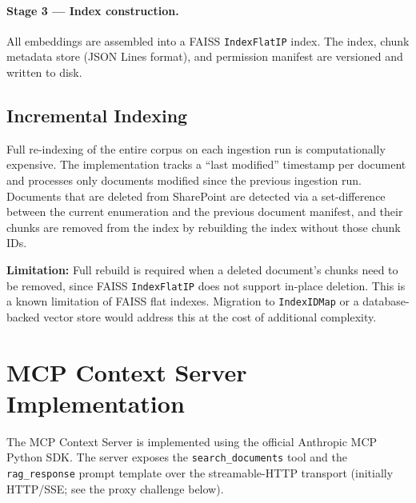 \paragraph{Stage 3 --- Index construction.} All embeddings are assembled into a FAISS \texttt{IndexFlatIP} index. The index, chunk metadata store (JSON Lines format), and permission manifest are versioned and written to disk.

\subsection{Incremental Indexing}

Full re-indexing of the entire corpus on each ingestion run is computationally expensive. The implementation tracks a ``last modified'' timestamp per document and processes only documents modified since the previous ingestion run. Documents that are deleted from SharePoint are detected via a set-difference between the current enumeration and the previous document manifest, and their chunks are removed from the index by rebuilding the index without those chunk IDs.

\textbf{Limitation:} Full rebuild is required when a deleted document's chunks need to be removed, since FAISS \texttt{IndexFlatIP} does not support in-place deletion. This is a known limitation of FAISS flat indexes. Migration to \texttt{IndexIDMap} or a database-backed vector store would address this at the cost of additional complexity.

\section{MCP Context Server Implementation}
\label{sec:impl-mcp-server}

The MCP Context Server is implemented using the official Anthropic MCP Python SDK. The server exposes the \texttt{search\_documents} tool and the \texttt{rag\_response} prompt template over the streamable-HTTP transport (initially HTTP/SSE; see the proxy challenge below).

